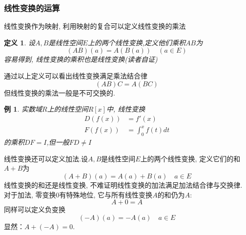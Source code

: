 \documentclass[a4paper,11pt]{article}
\newtheorem{definition}{\hspace{2em}定义}[section]
\newtheorem{example}{例}[section]
\begin{document}
\subsubsection*{线性变换的运算}
线性变换作为映射, 利用映射的复合可以定义线性变换的乘法
\begin{definition}
  设$A,B$是线性空间$E$上的两个线性变换,定义他们乘积$AB$为
  \begin{equation*}
    (AB)(a)=A(B(a))\quad (a\in E)
  \end{equation*}
  容易得到, 线性变换的乘积也是线性变换(读者自证)
\end{definition}
通过以上定义可以看出线性变换满足乘法结合律
\begin{equation*}
  (AB)C=A(BC)
\end{equation*}
但线性变换的乘法一般是不可交换的.
\begin{example}
  实数域$R$上的线性空间$R[x]$中, 线性变换
  \begin{equation*}
    \begin{split}
       D(f(x))&=f'(x)\\
       F(f(x))&=\int_{0}^{x}f(t)dt
    \end{split}
  \end{equation*}
  的乘积$DF=I$,但一般$FD\neq I$
\end{example}
线性变换还可以定义加法.设$A,B$是线性空间$E$上的两个线性变换, 定义它们的和$A+B$为
\begin{equation*}
  (A+B)(a)=A(a)+B(a)\quad a\in E
\end{equation*}
线性变换的和还是线性变换, 不难证明线性变换的加法满足加法结合律与交换律. 对于加法, 零变换$0$有特殊地位, 它与所有线性变换$A$的和仍为$A$:
\begin{equation*}
  A+0=A
\end{equation*}
同样可以定义负变换
\begin{equation*}
  (-A)(a)=-A(a)\quad a\in E
\end{equation*}
显然：$A+(-A)=0$.
\end{document}
